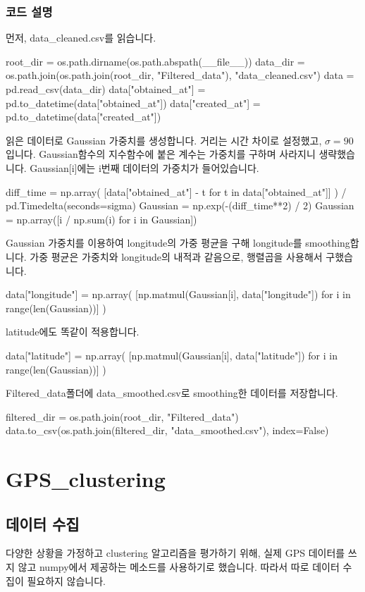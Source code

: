 \documentclass{oblivoir}
\begin{document}
  \subsection{코드 설명}
  먼저, data\_cleaned.csv를 읽습니다.
  \begin{python}[label={GPS_smooth_1}]
    root_dir = os.path.dirname(os.path.abspath(__file__))
    data_dir = os.path.join(os.path.join(root_dir, "Filtered_data"), "data_cleaned.csv")
    data = pd.read_csv(data_dir)
    data["obtained_at"] = pd.to_datetime(data["obtained_at"])
    data["created_at"] = pd.to_datetime(data["created_at"])
  \end{python}
  읽은 데이터로 Gaussian 가중치를 생성합니다. 거리는 시간 차이로 설정했고, $\sigma=90$입니다.
  Gaussian함수의 지수함수에 붙은 계수는 가중치를 구하며 사라지니 생략했습니다.
  Gaussian[i]에는 i번째 데이터의 가중치가 들어있습니다.
  \begin{python}[label={GPS_smooth_2}]
    diff_time = np.array(
        [data["obtained_at"] - t for t in data["obtained_at"]]
    ) / pd.Timedelta(seconds=sigma)
    Gaussian = np.exp(-(diff_time**2) / 2)
    Gaussian = np.array([i / np.sum(i) for i in Gaussian])
  \end{python}
  Gaussian 가중치를 이용하여 longitude의 가중 평균을 구해 longitude를 smoothing합니다.
  가중 평균은 가중치와 longitude의 내적과 같음으로, 행렬곱을 사용해서 구했습니다.
  \begin{python}[label={GPS_smooth_3}]
    data["longitude"] = np.array(
      [np.matmul(Gaussian[i], data["longitude"]) for i in range(len(Gaussian))]
    )
  \end{python}
  latitude에도 똑같이 적용합니다.
  \begin{python}[label={GPS_smooth_4}]
    data["latitude"] = np.array(
      [np.matmul(Gaussian[i], data["latitude"]) for i in range(len(Gaussian))]
    )
  \end{python}
  Filtered\_data폴더에 data\_smoothed.csv로 smoothing한 데이터를 저장합니다.
  \begin{python}[label={GPS_smooth_5}]
    filtered_dir = os.path.join(root_dir, "Filtered_data")
    data.to_csv(os.path.join(filtered_dir, "data_smoothed.csv"), index=False)
  \end{python}

  \chapter{GPS\_clustering}
  \setcounter{section}{0}
  \section{데이터 수집}
  다양한 상황을 가정하고 clustering 알고리즘을 평가하기 위해, 실제 GPS 데이터를 쓰지 않고 numpy에서 제공하는 메소드를 사용하기로 했습니다.
  따라서 따로 데이터 수집이 필요하지 않습니다.
\end{document}
